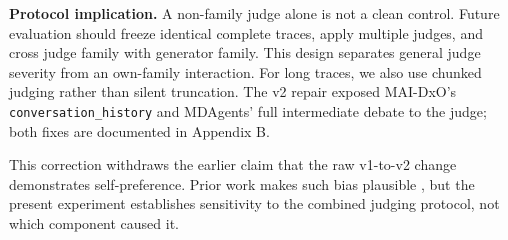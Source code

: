 \textbf{Protocol implication.} A non-family judge alone is not a clean control.
Future evaluation should freeze identical complete traces, apply multiple
judges, and cross judge family with generator family. This design separates
general judge severity from an own-family interaction. For long traces, we
also use chunked judging rather than silent truncation. The v2 repair exposed
MAI-DxO's \texttt{conversation\_history} and MDAgents' full intermediate debate to
the judge; both fixes are documented in Appendix B.

This correction withdraws the earlier claim that the raw v1-to-v2 change
demonstrates self-preference. Prior work makes such bias plausible
\citep{panickssery2024}, but the present experiment establishes
sensitivity to the combined judging protocol, not which component caused it.

